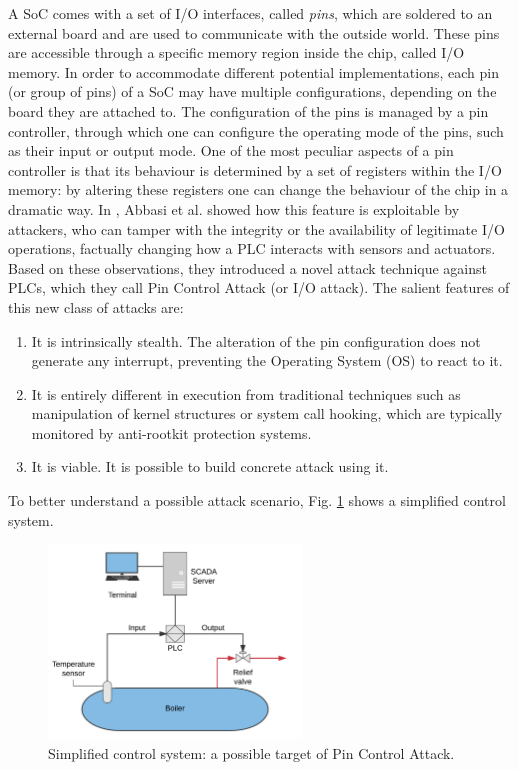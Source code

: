 A SoC comes with a set of I/O interfaces, called \emph{pins}, which are soldered to an external board and are used to communicate with the outside world.
These pins are accessible through a specific memory region inside the chip, called I/O memory.
In order to accommodate different potential implementations, each pin (or group of pins) of a SoC may have multiple configurations,
depending on the board they are attached to.
The configuration of the pins is managed by a pin controller, through which one can configure the operating mode of the pins, such as their input or output mode.
One of the most peculiar aspects of a pin controller is that its behaviour is determined by a set of registers within the I/O memory:
by altering these registers one can change the behaviour of the chip in a dramatic way.
In \cite{ghostplc}, Abbasi et al. showed how this feature is exploitable by attackers, who can tamper with
the integrity or the availability of legitimate I/O operations, factually changing how a PLC interacts with sensors and actuators.
Based on these observations, they introduced a novel attack technique against PLCs, which they call Pin Control Attack (or I/O attack).
The salient features of this new class of attacks are:
\begin{enumerate}[itemsep=2pt,topsep=0pt]
	\item It is intrinsically stealth. The alteration of the pin configuration does not generate any interrupt, preventing the Operating System (OS) to react to it.
	\item It is entirely different in execution from traditional techniques such as manipulation of kernel structures or system call hooking, which are typically
		monitored by anti-rootkit protection systems.
	\item It is viable. It is possible to build concrete attack using it.
\end{enumerate}

To better understand a possible attack scenario, Fig. \ref{fig:control} shows a simplified control system.
\begin{figure}[h!]
\centerline{\includegraphics[width=0.6\textwidth]{res/control}}
\caption{Simplified control system: a possible target of Pin Control Attack.\label{fig:control}}
\end{figure}


